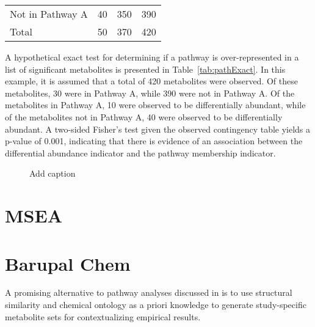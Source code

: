 \begin{DoubleSpace*}
\begin{table}[h!]
\begin{center}
\begin{tabular}{ l c c c }
			Not in Pathway A & 40 & 350 &  390 \\
			Total & 50 & 370 & 420\\
			\hline
		\end{tabular}
	\end{center}
\end{table}
A hypothetical exact test for determining if a pathway is over-represented in a list of significant metabolites is presented in Table~\ref{tab:pathExact}. In this example, it is assumed that a total of 420 metabolites were observed. Of these metabolites, 30 were in Pathway A, while 390 were not in Pathway A. Of the metabolites in Pathway A, 10 were observed to be differentially abundant, while of the metabolites not in Pathway A, 40 were observed to be differentially abundant. A two-sided Fisher's test given the observed contingency table yields a p-value of 0.001, indicating that there is evidence of an association between the differential abundance indicator and the pathway membership indicator. 

\begin{figure}[ht]
	\caption[Add caption]{Add caption \label{fig:vennHell} }
\end{figure}

\section{MSEA}

\section{Barupal Chem}
A promising alternative to pathway analyses discussed in \cite{barupal2017} is to use structural similarity and chemical ontology as a priori knowledge to generate study-specific metabolite sets for contextualizing empirical results. 


\end{DoubleSpace*}
